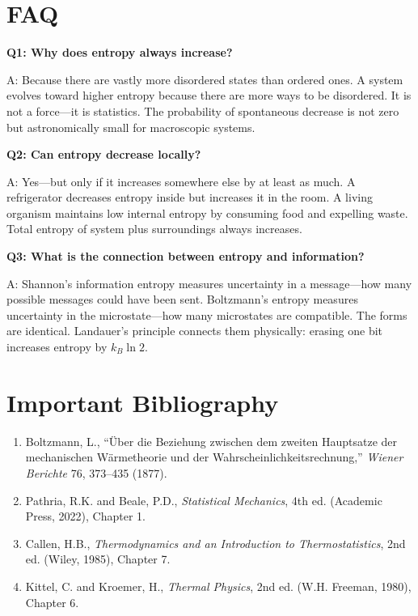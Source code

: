 \section*{FAQ}

\textbf{Q1: Why does entropy always increase?}

A: Because there are vastly more disordered states than ordered ones. A system evolves toward higher entropy because there are more ways to be disordered. It is not a force---it is statistics. The probability of spontaneous decrease is not zero but astronomically small for macroscopic systems.

\textbf{Q2: Can entropy decrease locally?}

A: Yes---but only if it increases somewhere else by at least as much. A refrigerator decreases entropy inside but increases it in the room. A living organism maintains low internal entropy by consuming food and expelling waste. Total entropy of system plus surroundings always increases.

\textbf{Q3: What is the connection between entropy and information?}

A: Shannon's information entropy measures uncertainty in a message---how many possible messages could have been sent. Boltzmann's entropy measures uncertainty in the microstate---how many microstates are compatible. The forms are identical. Landauer's principle connects them physically: erasing one bit increases entropy by $k_B \ln 2$.
\section*{Important Bibliography}

\begin{enumerate}
\item Boltzmann, L., ``\"Uber die Beziehung zwischen dem zweiten Hauptsatze der mechanischen W\"armetheorie und der Wahrscheinlichkeitsrechnung,'' \textit{Wiener Berichte} 76, 373--435 (1877).
\item Pathria, R.K. and Beale, P.D., \textit{Statistical Mechanics}, 4th ed. (Academic Press, 2022), Chapter 1.
\item Callen, H.B., \textit{Thermodynamics and an Introduction to Thermostatistics}, 2nd ed. (Wiley, 1985), Chapter 7.
\item Kittel, C. and Kroemer, H., \textit{Thermal Physics}, 2nd ed. (W.H. Freeman, 1980), Chapter 6.
\end{enumerate}

